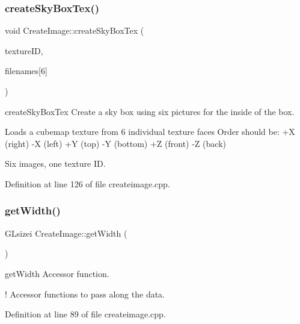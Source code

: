 \mbox{\label{classCreateImage_acbff5ee9dfb7e64bcf850cce6f3ee13d}} 
\subsubsection{\texorpdfstring{create\+Sky\+Box\+Tex()}{createSkyBoxTex()}}
{\footnotesize\ttfamily void Create\+Image\+::create\+Sky\+Box\+Tex (\begin{DoxyParamCaption}\item[{G\+Luint \&}]{texture\+ID,  }\item[{string}]{filenames\mbox{[}6\mbox{]} }\end{DoxyParamCaption})}



create\+Sky\+Box\+Tex Create a sky box using six pictures for the inside of the box. 

Loads a cubemap texture from 6 individual texture faces Order should be\+: +X (right) -\/X (left) +Y (top) -\/Y (bottom) +Z (front) -\/Z (back)

Six images, one texture ID. 

Definition at line 126 of file createimage.\+cpp.

\mbox{\label{classCreateImage_ac0edbffce968346bd4c43564beb27c26}} 
\subsubsection{\texorpdfstring{get\+Width()}{getWidth()}}
{\footnotesize\ttfamily G\+Lsizei Create\+Image\+::get\+Width (\begin{DoxyParamCaption}{ }\end{DoxyParamCaption})}



get\+Width Accessor function. 

! Accessor functions to pass along the data. 

Definition at line 89 of file createimage.\+cpp.

\mbox{\label{classCreateImage_a0fb8715c56dc5ff120aa355ca66496f6}} 
